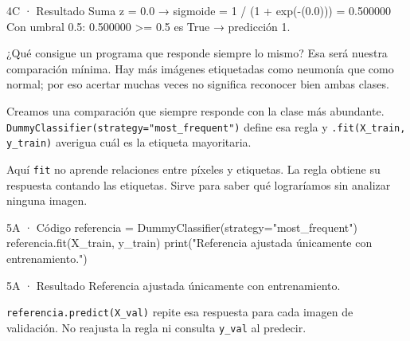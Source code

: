 
\begin{Salida}{4C · Resultado}
Suma z = 0.0 → sigmoide = 1 / (1 + exp(-(0.0))) = 0.500000
Con umbral 0.5: 0.500000 >= 0.5 es True → predicción 1.
\end{Salida}

\label{bloque-5}

¿Qué consigue un programa que responde siempre lo mismo? Esa será nuestra comparación mínima. Hay más imágenes etiquetadas como neumonía que como normal; por eso acertar muchas veces no significa reconocer bien ambas clases.


\label{paso-5a}

Creamos una comparación que siempre responde con la clase más abundante. \texttt{\small DummyClassifier(\allowbreak{}strategy=\allowbreak{}"most\_\allowbreak{}frequent")\allowbreak{}} define esa regla y \texttt{\small .\allowbreak{}fit(\allowbreak{}X\_\allowbreak{}train,\allowbreak{} y\_\allowbreak{}train)\allowbreak{}} averigua cuál es la etiqueta mayoritaria.

Aquí \texttt{\small fit} no aprende relaciones entre píxeles y etiquetas. La regla obtiene su respuesta contando las etiquetas. Sirve para saber qué lograríamos sin analizar ninguna imagen.


\begin{Codigo}{5A · Código}
referencia = DummyClassifier(strategy="most_frequent")
referencia.fit(X_train, y_train)
print("Referencia ajustada únicamente con entrenamiento.")
\end{Codigo}

\begin{Salida}{5A · Resultado}
Referencia ajustada únicamente con entrenamiento.
\end{Salida}

\label{paso-5b}

\texttt{\small referencia.\allowbreak{}predict(\allowbreak{}X\_\allowbreak{}val)\allowbreak{}} repite esa respuesta para cada imagen de validación. No reajusta la regla ni consulta \texttt{\small y\_\allowbreak{}val} al predecir.

